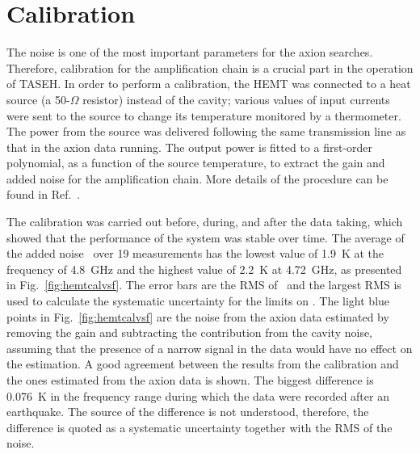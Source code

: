 \section{Calibration} \label{sec:hemtcalibration}
\label{sec:calibration}

The noise is one of the most important parameters for the axion searches. 
Therefore, calibration for the amplification chain is a 
crucial part in the operation of TASEH. In order to perform a calibration, 
the HEMT was connected to a heat source (a 50-$\Omega$ resistor) instead of 
the cavity; 
various values of input currents were sent to the source to change its 
temperature monitored by a thermometer. The power from the source 
was delivered following the same transmission line as that in the axion 
data running. 
The output power is fitted to a first-order polynomial, as a function of 
the source temperature, to extract the gain and added noise for the 
amplification chain. More details of the 
procedure can be found in Ref.~\cite{TASEHInstrumentation}. 

The calibration was carried out before, during, and after the data taking, 
which showed that the performance of the system was stable over time. The 
average of the added noise \ta\ over 19 measurements has the lowest value of 
1.9~K at the frequency of 4.8~GHz and the highest value of 
2.2~K at 4.72~GHz, as presented in Fig.~\ref{fig:hemtcalvsf}. 
The error bars are the RMS of \ta\ and the largest RMS is used to calculate 
the systematic uncertainty for the limits on \gagg. The light blue points in 
Fig.~\ref{fig:hemtcalvsf} are the noise from the axion data estimated by 
removing the gain and subtracting the contribution from the cavity noise, 
assuming 
that the presence of a narrow signal in the data would have no effect on the 
estimation. A good agreement between the results from the calibration  
and the ones estimated from the axion data is shown. The biggest 
difference is 0.076~K in the frequency range during which the data were 
recorded after an earthquake. The source of the difference is not understood, 
therefore, the difference is quoted as a systematic uncertainty together 
with the RMS of the noise.

